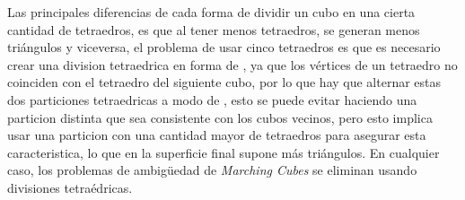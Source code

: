 Las principales diferencias de cada forma de dividir un cubo en una cierta cantidad de tetraedros, es que al tener menos tetraedros, se generan menos triángulos y viceversa, el problema de usar cinco tetraedros es que es necesario crear una division tetraedrica en forma de , ya que los vértices de un tetraedro no coinciden con el tetraedro del siguiente cubo, por lo que hay que alternar estas dos particiones tetraedricas a modo de , esto se puede evitar haciendo una particion distinta que sea consistente con los cubos vecinos, pero esto implica usar una particion con una cantidad mayor de tetraedros para asegurar esta caracteristica, lo que en la superficie final supone más triángulos. En cualquier caso, los problemas de ambigüedad de \emph{Marching Cubes} se eliminan usando divisiones tetraédricas.